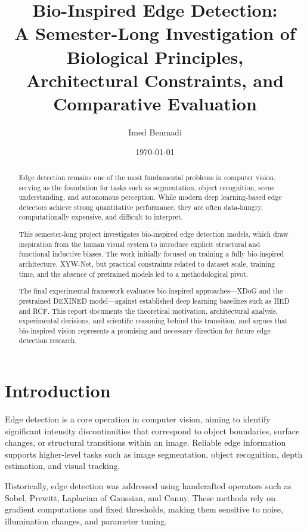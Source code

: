 \documentclass[12pt]{article}
\title{Bio-Inspired Edge Detection:\\
A Semester-Long Investigation of Biological Principles,\\
Architectural Constraints, and Comparative Evaluation}
\author{Imed Benmadi}
\date{\today}
\begin{document}
\maketitle

\begin{abstract}
Edge detection remains one of the most fundamental problems in computer vision,
serving as the foundation for tasks such as segmentation, object recognition,
scene understanding, and autonomous perception. While modern deep learning-based
edge detectors achieve strong quantitative performance, they are often data-hungry,
computationally expensive, and difficult to interpret.

This semester-long project investigates bio-inspired edge detection models, which
draw inspiration from the human visual system to introduce explicit structural and
functional inductive biases. The work initially focused on training a fully
bio-inspired architecture, XYW-Net, but practical constraints related to dataset
scale, training time, and the absence of pretrained models led to a methodological
pivot.

The final experimental framework evaluates bio-inspired approaches—XDoG and the
pretrained DEXINED model—against established deep learning baselines such as HED
and RCF. This report documents the theoretical motivation, architectural analysis,
experimental decisions, and scientific reasoning behind this transition, and
argues that bio-inspired vision represents a promising and necessary direction for
future edge detection research.
\end{abstract}

\newpage
\tableofcontents
\newpage

\section{Introduction}

Edge detection is a core operation in computer vision, aiming to identify
significant intensity discontinuities that correspond to object boundaries,
surface changes, or structural transitions within an image. Reliable edge
information supports higher-level tasks such as image segmentation, object
recognition, depth estimation, and visual tracking.

Historically, edge detection was addressed using handcrafted operators such as
Sobel, Prewitt, Laplacian of Gaussian, and Canny. These methods rely on gradient
computations and fixed thresholds, making them sensitive to noise, illumination
changes, and parameter tuning.
\end{document}
